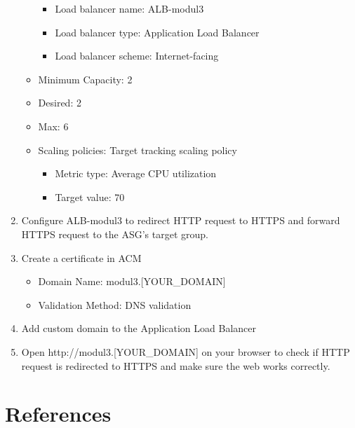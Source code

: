 \documentclass{article}
\begin{document}
\begin{enumerate}
\begin{itemize}
        \begin{itemize}
            \item Load balancer name: ALB-modul3
            \item Load balancer type: Application Load Balancer
            \item Load balancer scheme: Internet-facing
        \end{itemize}
        \item Minimum Capacity: 2
        \item Desired: 2
        \item Max: 6
        \item Scaling policies: Target tracking scaling policy
        \begin{itemize}
            \item Metric type: Average CPU utilization
            \item Target value: 70
        \end{itemize}
    \end{itemize}
    \item Configure ALB-modul3 to redirect HTTP request to HTTPS and forward HTTPS request to the ASG's target group.
    \item Create a certificate in ACM
    \begin{itemize}
        \item Domain Name: modul3.[YOUR\_DOMAIN]
        \item Validation Method: DNS validation
    \end{itemize}
    \item Add custom domain to the Application Load Balancer
    \item Open http://modul3.[YOUR\_DOMAIN] on your browser to check if HTTP request is redirected to HTTPS and make sure the web works correctly.
\end{enumerate}

\section{References}\label{references}
\end{document}
